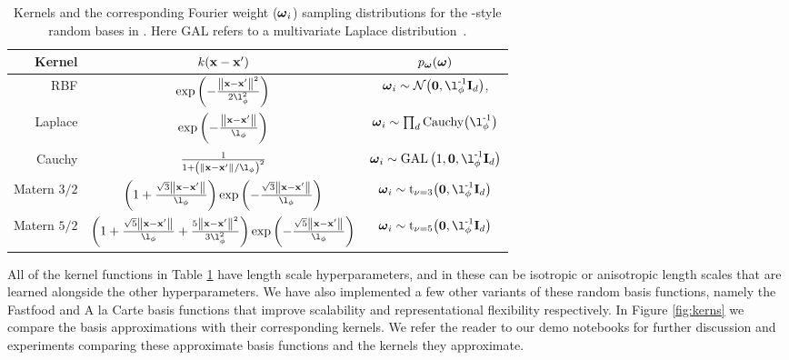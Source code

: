 \documentclass[11pt, oneside]{article}
\begin{document}
\begin{table}[htb]

    \centering

    \caption{Kernels and the corresponding Fourier weight ($\boldsymbol{\omega}_i$)
        sampling distributions for the \citet{rahimi2007}-style random bases in
        \revrand{}. Here GAL refers to a multivariate Laplace
        distribution~\cite{kozubowski2013multivariate}.}

    \begin{tabular}{r|c c}
        \textbf{Kernel} & $k\!\left({\mathbf{x} - \mathbf{x}'}\right)$
        & $p_{\boldsymbol{\omega}}(\boldsymbol{\omega})$ \\
        \hline
        RBF &
        $\exp\brac{-\frac{\lnorm{}{\inss - \inssprime}^2}{2\lenscale^2}}$ &
            $\ffourier_i \sim \gaus{\mathbf{0}, \lenscale\inv\ident{d}}$, \\
        Laplace & $\exp\brac{-\frac{\lnorm{}{\inss-\inssprime}}{\lenscale}}$ &
            $\ffourier_i \sim \prod_d \text{Cauchy}\!\brac{\lenscale\inv}$ \\
        Cauchy &
            $\frac{1}{1+\brac{\lnorm{}{\inss-\inssprime}/\lenscale}^2}$ & 
            $\ffourier_i \sim \text{GAL}\brac{1, \mathbf{0},
                \lenscale\inv\ident{d}}$ \\
        Matern $3/2$ & 
            $\brac{1 + \frac{\sqrt{3}\lnorm{}{\inss-\inssprime}}{\lenscale}}
            \exp\brac{-\frac{\sqrt{3}\lnorm{}{\inss-\inssprime}}{\lenscale}}$ & 
            $\ffourier_i \sim 
            \text{t}_{\nu=3}\!\brac{\mathbf{0}, \lenscale\inv\ident{d}}$ \\
        Matern $5/2$ &
            $\brac{1 + \frac{\sqrt{5}\lnorm{}{\inss-\inssprime}}{\lenscale} + 
                \frac{5\lnorm{}{\inss - \inssprime}^2}{3\lenscale^2}}
            \exp\brac{-\frac{\sqrt{5}\lnorm{}{\inss-\inssprime}}{\lenscale}}$ & 
            $\ffourier_i \sim 
            \text{t}_{\nu=5}\!\brac{\mathbf{0}, \lenscale\inv\ident{d}}$ \\
        \hline
    \end{tabular}

    \label{tab:randommappings}

\end{table}

All of the kernel functions in Table \ref{tab:randommappings} have length scale
hyperparameters, and in \revrand{} these can be isotropic or anisotropic length
scales that are learned alongside the other hyperparameters. We have also
implemented a few other variants of these random basis functions, namely the
Fastfood \citep{le2013fastfood} and A la Carte \citep{yang2014} basis functions
that improve scalability and representational flexibility respectively. In
Figure \ref{fig:kerns} we compare the basis approximations with their
corresponding kernels. We refer the reader to our demo notebooks for further
discussion and experiments comparing these approximate basis functions and the
kernels they approximate.
\end{document}
